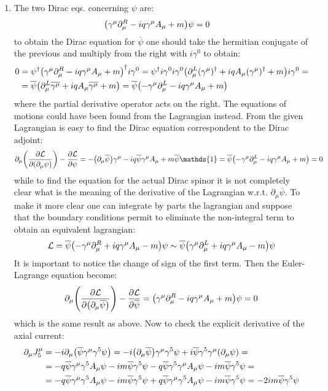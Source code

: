 \documentclass[11pt, oneside]{article}   	%
\begin{document}
\begin{enumerate}[label=\alph*)]
\item The two Dirac eqs. concerning $\psi$ are:
\begin{align*}
	\qty(\gamma^\mu \partial_\mu^R - i q \gamma^\mu A_\mu + m)\psi &= 0 
\end{align*}
to obtain the Dirac equation for $\overline{\psi}$ one should take the hermitian conjugate of the previous and multiply from the right with $i\gamma^0$ to obtain:
\begin{align*}
	0&=\psi^\dagger \qty(\gamma^\mu \partial_\mu^R - i q \gamma^\mu A_\mu + m)^\dagger i\gamma^0 = \psi^\dagger i \gamma^0 i\gamma^0 \qty(\partial_\mu^L (\gamma^\mu)^\dagger + i q A_\mu (\gamma^\mu)^\dagger  + m) i\gamma^0 = \\
	&= \overline{\psi} \qty( \partial_\mu^L \overline{\gamma^\mu}  + iq A_\mu \overline{\gamma^\mu} + m) = \overline{\psi} \qty( - \gamma^\mu \partial_\mu^L - iq\gamma^\mu A_\mu + m)
\end{align*}
where the partial derivative operator acts on the right.
The equations of motions could have been found from the Lagrangian instead. From the given Lagrangian is easy to find the Dirac equation correspondent to the Dirac adjoint:
\[
	\partial_\mu \qty(\pdv{\mathcal{L}}{\qty(\partial_\mu \psi)} ) - \pdv{\mathcal{L}}{\psi} = -\qty(\partial_\mu \overline{\psi} ) \gamma^\mu - iq \overline{\psi} \gamma^\mu A_\mu + m \overline{\psi} \mathds{1} = \overline{\psi} \qty( - \gamma^\mu \partial_\mu^L - iq\gamma^\mu A_\mu + m) = 0 
\]
while to find the equation for the actual Dirac spinor it is not completely clear what is the meaning of the derivative of the Lagrangian w.r.t. $\partial_\mu\overline{\psi}$. To make it more clear one can integrate by parts the lagrangian and suppose that the boundary conditions permit to eliminate the non-integral term to obtain an equivalent lagrangian:
\[
	\mathcal{L} = \overline{\psi} \qty( -\gamma^\mu \partial_\mu^R + i q\gamma^\mu A_\mu -m ) \psi \sim \overline{\psi} \qty( \gamma^\mu \partial_\mu^L + i q\gamma^\mu A_\mu -m ) \psi
\]
It is important to notice the change of sign of the first term. Then the Euler-Lagrange equation become:
\[
	\partial_\mu \qty(\pdv{\mathcal{L}}{\qty(\partial_\mu \overline{\psi})} ) - \pdv{\mathcal{L}}{\overline{\psi}} = \qty(\gamma^\mu \partial_\mu^R - iq\gamma^\mu A_\mu + m)\psi = 0
\]
which is the same result as above.
Now to check the explicit derivative of the axial current:
\begin{align*}
	\partial_\mu J^\mu_5 &= -i \partial_\mu \qty( \overline{\psi} \gamma^\mu \gamma^5 \psi ) = -i \qty( \partial_\mu \overline{\psi}) \gamma^\mu \gamma^5 \psi + i \overline{\psi} \gamma^5 \gamma^\mu \qty( \partial_\mu \psi) = \\
	&= -q \overline{\psi} \gamma^\mu \gamma^5 A_\mu \psi - im\overline{\psi} \gamma^5 \psi -q \overline{\psi} \gamma^5 \gamma^\mu A_\mu \psi - im\overline{\psi} \gamma^5 \psi = \\
	&= -q \overline{\psi} \gamma^\mu \gamma^5 A_\mu \psi - im\overline{\psi} \gamma^5 \psi +q \overline{\psi} \gamma^\mu \gamma^5 A_\mu \psi - im\overline{\psi} \gamma^5 \psi = -2im \overline{\psi} \gamma^5 \psi
\end{align*}


\end{enumerate}
\end{document}
